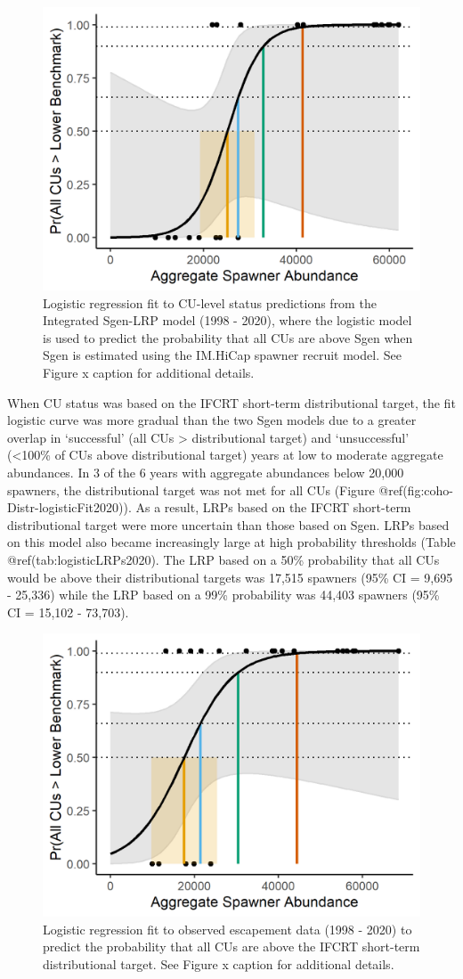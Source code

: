 \documentclass[
]{article}
\begin{document}
\begin{figure}

{\centering \includegraphics[width=0.5\linewidth]{figure/coho-IMCap2020-LogisticLRP} 

}

\caption{Logistic regression fit to CU-level status predictions from the Integrated Sgen-LRP model (1998 - 2020), where the logistic model is used to predict the probability that all CUs are above Sgen when Sgen is estimated using the IM.HiCap spawner recruit model. See Figure x caption for additional details.}\label{fig:coho-IMCap-logisticFit2020}
\end{figure}

When CU status was based on the IFCRT short-term distributional target,
the fit logistic curve was more gradual than the two Sgen models due to
a greater overlap in `successful' (all CUs \textgreater{} distributional
target) and `unsuccessful' (\textless100\% of CUs above distributional
target) years at low to moderate aggregate abundances. In 3 of the 6
years with aggregate abundances below 20,000 spawners, the
distributional target was not met for all CUs (Figure
@ref(fig:coho-Distr-logisticFit2020)). As a result, LRPs based on the
IFCRT short-term distributional target were more uncertain than those
based on Sgen. LRPs based on this model also became increasingly large
at high probability thresholds (Table @ref(tab:logisticLRPs2020). The
LRP based on a 50\% probability that all CUs would be above their
distributional targets was 17,515 spawners (95\% CI = 9,695 - 25,336)
while the LRP based on a 99\% probability was 44,403 spawners (95\% CI =
15,102 - 73,703).

\begin{figure}

{\centering \includegraphics[width=0.5\linewidth]{figure/coho-ThreshAb2020-LogisticLRP} 

}

\caption{Logistic regression fit to observed escapement data (1998 - 2020) to predict the probability that all CUs are above the IFCRT short-term distributional target. See Figure x caption for additional details.}\label{fig:coho-Distr-logisticFit2020}
\end{figure}
\end{document}

